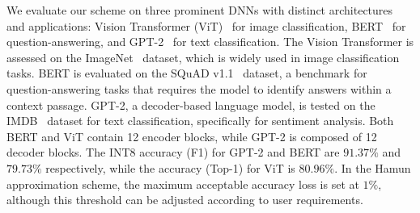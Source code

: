 \begin{table}[t!]
\caption{Hamun accelerator configuration parameters.}
\label{tab:Param}
\centering
{}
\vskip -0.20in
\end{table}

We evaluate our scheme on three prominent DNNs with distinct architectures and applications: Vision Transformer (ViT)~\cite{ViT} for image classification, BERT~\cite{BERT} for question-answering, and GPT-2~\cite{GPT2} for text classification. The Vision Transformer is assessed on the ImageNet~\cite{ImageNet} dataset, which is widely used in image classification tasks. BERT is evaluated on the SQuAD v1.1~\cite{SQuAD} dataset, a benchmark for question-answering tasks that requires the model to identify answers within a context passage. GPT-2, a decoder-based language model, is tested on the IMDB~\cite{imdb} dataset for text classification, specifically for sentiment analysis. Both BERT and ViT contain 12 encoder blocks, while GPT-2 is composed of 12 decoder blocks. The INT8 accuracy (F1) for GPT-2 and BERT are $91.37\%$ and $79.73\%$ respectively, while the accuracy (Top-1) for ViT is $80.96\%$. In the Hamun approximation scheme, the maximum acceptable accuracy loss is set at $1\%$, although this threshold can be adjusted according to user requirements.
